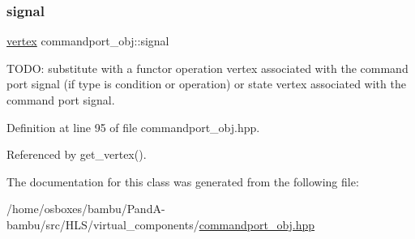 \subsubsection{\texorpdfstring{signal}{signal}}
{\footnotesize\ttfamily \hyperlink{graph_8hpp_abefdcf0544e601805af44eca032cca14}{vertex} commandport\+\_\+obj\+::signal\hspace{0.3cm}{\ttfamily [private]}}



T\+O\+DO\+: substitute with a functor operation vertex associated with the command port signal (if type is condition or operation) or state vertex associated with the command port signal. 



Definition at line 95 of file commandport\+\_\+obj.\+hpp.



Referenced by get\+\_\+vertex().



The documentation for this class was generated from the following file\+:\begin{DoxyCompactItemize}
\item 
/home/osboxes/bambu/\+Pand\+A-\/bambu/src/\+H\+L\+S/virtual\+\_\+components/\hyperlink{commandport__obj_8hpp}{commandport\+\_\+obj.\+hpp}\end{DoxyCompactItemize}
